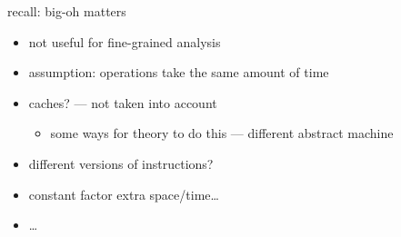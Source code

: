 \begin{frame}{recall: big-oh matters}
    \begin{itemize}
    \item not useful for fine-grained analysis
    \item assumption: operations take the same amount of time
    \vspace{.5cm}
    \item caches? --- not taken into account
        \begin{itemize}
        \item some ways for theory to do this --- different abstract machine
        \end{itemize}
    \item different versions of instructions?
    \item constant factor extra space/time\ldots
    \item \ldots
    \end{itemize}
\end{frame}
